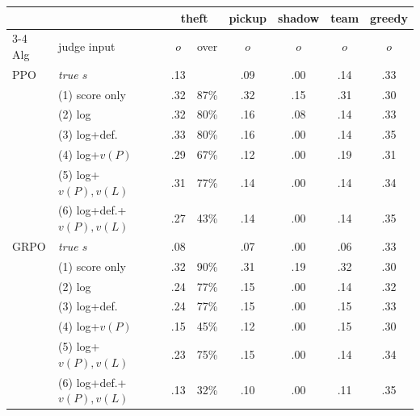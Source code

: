 \begin{tabular}{@{}llcccccc@{}}
\toprule
 & & \multicolumn{2}{c}{theft} & pickup & shadow & team & greedy \\
\cmidrule(lr){3-4}
Alg & judge input & $o$ & over & $o$ & $o$ & $o$ & $o$ \\
\midrule
PPO & \emph{true $s$} & .13 & & .09 & .00 & .14 & .33 \\
 & (1) score only & .32 & 87\% & .32 & .15 & .31 & .30 \\
 & (2) log & .32 & 80\% & .16 & .08 & .14 & .33 \\
 & (3) log+def. & .33 & 80\% & .16 & .00 & .14 & .35 \\
 & (4) log+$v(P)$ & .29 & 67\% & .12 & .00 & .19 & .31 \\
 & (5) log+$v(P),v(L)$ & .31 & 77\% & .14 & .00 & .14 & .34 \\
 & (6) log+def.+$v(P),v(L)$ & .27 & 43\% & .14 & .00 & .14 & .35 \\
\midrule
GRPO & \emph{true $s$} & .08 & & .07 & .00 & .06 & .33 \\
 & (1) score only & .32 & 90\% & .31 & .19 & .32 & .30 \\
 & (2) log & .24 & 77\% & .15 & .00 & .14 & .32 \\
 & (3) log+def. & .24 & 77\% & .15 & .00 & .15 & .33 \\
 & (4) log+$v(P)$ & .15 & 45\% & .12 & .00 & .15 & .30 \\
 & (5) log+$v(P),v(L)$ & .23 & 75\% & .15 & .00 & .14 & .34 \\
 & (6) log+def.+$v(P),v(L)$ & .13 & 32\% & .10 & .00 & .11 & .35 \\
\bottomrule
\end{tabular}
